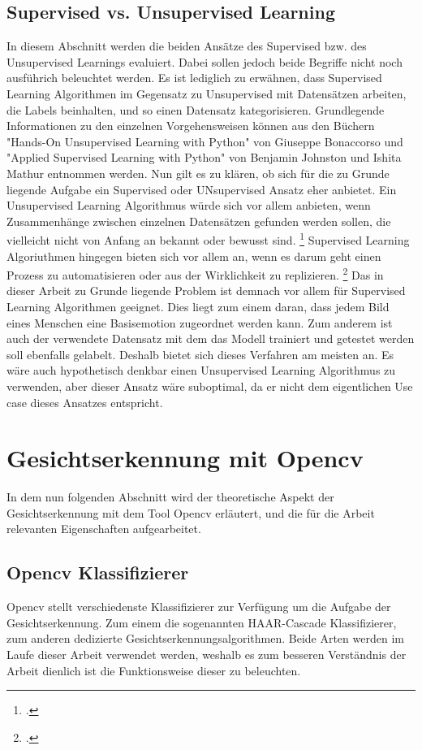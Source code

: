 \documentclass[12pt, a4paper]{scrbook}
\begin{document}
\subsection{Supervised vs. Unsupervised Learning}
In diesem Abschnitt werden die beiden Ansätze des Supervised bzw. des Unsupervised Learnings evaluiert. Dabei sollen jedoch beide Begriffe nicht noch ausführich beleuchtet werden. Es ist lediglich zu erwähnen, dass Supervised Learning Algorithmen im Gegensatz zu Unsupervised mit Datensätzen arbeiten, die Labels beinhalten, und so einen Datensatz kategorisieren.  Grundlegende Informationen zu den einzelnen Vorgehensweisen  können aus den Büchern "Hands-On Unsupervised Learning with Python" von Giuseppe Bonaccorso und "Applied Supervised Learning with Python" von Benjamin Johnston und Ishita Mathur entnommen werden.
Nun gilt es zu klären, ob sich für die zu Grunde liegende Aufgabe ein Supervised oder UNsupervised Ansatz eher anbietet. Ein Unsupervised Learning Algorithmus würde sich vor allem anbieten, wenn Zusammenhänge zwischen einzelnen Datensätzen gefunden werden sollen, die vielleicht nicht von Anfang an bekannt oder bewusst sind.
\footcite[Vgl. ][21]{Unsupervised}
 Supervised Learning Algoriuthmen hingegen bieten sich vor allem an, wenn es darum geht einen Prozess zu automatisieren oder aus der Wirklichkeit zu replizieren.
\footcite[Vgl. ][4]{Supervised}
Das in dieser Arbeit zu Grunde liegende Problem ist demnach vor allem für Supervised Learning Algorithmen geeignet. Dies liegt zum einem daran, dass jedem Bild eines Menschen eine Basisemotion zugeordnet werden kann. Zum anderem ist auch der verwendete Datensatz mit dem das Modell trainiert und getestet werden soll ebenfalls gelabelt. Deshalb bietet sich dieses Verfahren am meisten an. Es wäre auch hypothetisch denkbar einen Unsupervised Learning Algorithmus zu verwenden, aber dieser Ansatz wäre suboptimal, da er nicht dem eigentlichen Use case dieses Ansatzes entspricht.

\section{Gesichtserkennung mit Opencv}
In dem nun folgenden Abschnitt wird der theoretische Aspekt der Gesichtserkennung mit dem Tool Opencv erläutert, und die für die Arbeit relevanten Eigenschaften aufgearbeitet.
\subsection{Opencv Klassifizierer}
Opencv stellt verschiedenste Klassifizierer zur Verfügung um die Aufgabe der Gesichtserkennung. Zum einem die sogenannten HAAR-Cascade Klassifizierer, zum anderen dedizierte Gesichtserkennungsalgorithmen. Beide Arten werden im Laufe dieser Arbeit verwendet werden, weshalb es zum besseren Verständnis der Arbeit dienlich ist die Funktionsweise dieser zu beleuchten.
\end{document}
